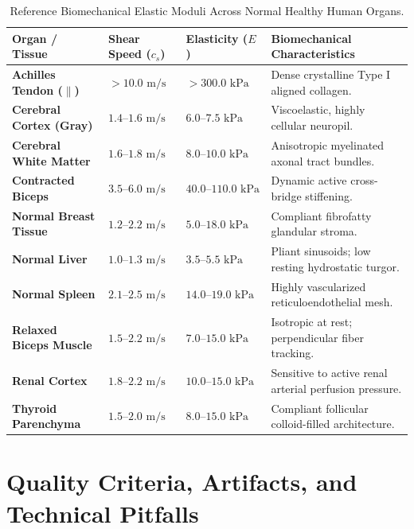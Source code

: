 \documentclass[11pt,a4paper]{article}
\begin{document}
\begin{table}[htbp]
\centering
\small
\setlength{\tabcolsep}{2.5pt}
\caption{Reference Biomechanical Elastic Moduli Across Normal Healthy Human Organs.}
\label{tab:tissue_stiffness_norms}
\begin{tabular}{p{3.2cm} p{2.6cm} p{2.6cm} p{5.5cm}}
\toprule
\textbf{Organ / Tissue} & \textbf{Shear Speed ($c_s$)} & \textbf{Elasticity ($E$)} & \textbf{Biomechanical Characteristics} \\
\midrule
\textbf{Achilles Tendon ($\parallel$)} & $> 10.0\text{ m/s}$ & $> 300.0\text{ kPa}$ & Dense crystalline Type I aligned collagen. \\
\addlinespace
\textbf{Cerebral Cortex (Gray)} & $1.4\text{--}1.6\text{ m/s}$ & $6.0\text{--}7.5\text{ kPa}$ & Viscoelastic, highly cellular neuropil. \\
\addlinespace
\textbf{Cerebral White Matter} & $1.6\text{--}1.8\text{ m/s}$ & $8.0\text{--}10.0\text{ kPa}$ & Anisotropic myelinated axonal tract bundles. \\
\addlinespace
\textbf{Contracted Biceps} & $3.5\text{--}6.0\text{ m/s}$ & $40.0\text{--}110.0\text{ kPa}$ & Dynamic active cross-bridge stiffening. \\
\addlinespace
\textbf{Normal Breast Tissue} & $1.2\text{--}2.2\text{ m/s}$ & $5.0\text{--}18.0\text{ kPa}$ & Compliant fibrofatty glandular stroma. \\
\addlinespace
\textbf{Normal Liver} & $1.0\text{--}1.3\text{ m/s}$ & $3.5\text{--}5.5\text{ kPa}$ & Pliant sinusoids; low resting hydrostatic turgor. \\
\addlinespace
\textbf{Normal Spleen} & $2.1\text{--}2.5\text{ m/s}$ & $14.0\text{--}19.0\text{ kPa}$ & Highly vascularized reticuloendothelial mesh. \\
\addlinespace
\textbf{Relaxed Biceps Muscle} & $1.5\text{--}2.2\text{ m/s}$ & $7.0\text{--}15.0\text{ kPa}$ & Isotropic at rest; perpendicular fiber tracking. \\
\addlinespace
\textbf{Renal Cortex} & $1.8\text{--}2.2\text{ m/s}$ & $10.0\text{--}15.0\text{ kPa}$ & Sensitive to active renal arterial perfusion pressure. \\
\addlinespace
\textbf{Thyroid Parenchyma} & $1.5\text{--}2.0\text{ m/s}$ & $8.0\text{--}15.0\text{ kPa}$ & Compliant follicular colloid-filled architecture. \\
\bottomrule
\end{tabular}
\end{table}

\section{Quality Criteria, Artifacts, and Technical Pitfalls}
\end{document}
